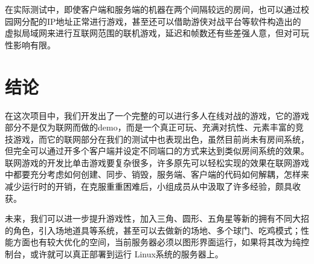 \documentclass[conference]{IEEEtran}
\begin{document}
  在实际测试中，即使客户端和服务端的机器在两个间隔较远的房间，也可以通过校园网分配的IP地址正常进行游戏，甚至还可以借助游侠对战平台等软件构造出的虚拟局域网来进行互联网范围的联机游戏，延迟和帧数还有些差强人意，但对可玩性影响有限。

\section{结论}
在这次项目中，我们开发出了一个完整的可以进行多人在线对战的游戏，它的游戏部分不是仅为联网而做的demo，而是一个真正可玩、充满对抗性、元素丰富的竞技游戏，而它的联网部分在我们的测试中也表现出色，虽然目前尚未有房间系统，但完全可以通过开多个客户端并设定不同端口的方式来达到类似房间系统的效果。联网游戏的开发比单击游戏要复杂很多，许多原先可以轻松实现的效果在联网游戏中都要充分考虑如何创建、同步、销毁，服务端、客户端的代码如何解耦，怎样来减少运行时的开销，在克服重重困难后，小组成员从中汲取了许多经验，颇具收获。

未来，我们可以进一步提升游戏性，加入三角、圆形、五角星等新的拥有不同大招的角色，引入场地道具等系统，甚至可以去做新的场地、多个球门、吃鸡模式；性能方面也有较大优化的空间，当前服务器必须以图形界面运行，如果将其改为纯控制台，或许就可以真正部署到运行 Linux系统的服务器上。




\end{document}
